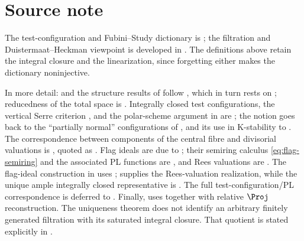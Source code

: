 \section*{Source note}

The test-configuration and Fubini--Study dictionary is
\cite[\S\S1--2]{BJ22}; the filtration and Duistermaat--Heckman viewpoint is
developed in \cite{BHJ17}.  The definitions above retain the integral
closure and the linearization, since forgetting either makes the dictionary
noninjective.

In more detail:  and the structure results
of  follow \cite[\S1.2]{BJ22}, which in turn
rests on \cite[\S2]{BHJ17}; reducedness of the total space is
\cite[Proposition~2.6]{BHJ17}.  Integrally closed test configurations, the
vertical Serre criterion , and
the polar-scheme argument in  are
\cite[\S1.4]{BJ22}; the notion goes back to the ``partially normal''
configurations of \cite{Od13}, and its use in K-stability to
\cite{Od13,Od13b}.  The correspondence between components of the central
fibre and divisorial valuations is \cite[Theorem~4.6]{BHJ17}, quoted as
\cite[Lemma~1.20]{BJ22}.  Flag ideals are due to \cite{Od13}; their
semiring calculus \eqref{eq:flag-semiring} and the associated PL functions
are \cite[\S2.1]{BJ22}, and Rees valuations are
\cite[Definition~2.10]{BJ22}.  The flag-ideal construction in
 uses
\cite[Lemmas~2.8--2.9 and Proposition~2.25]{BJ22};
\cite[Lemma~2.12]{BJ22} supplies the Rees-valuation realization, while the
unique ample integrally closed representative is
\cite[Proposition~2.30]{BJ22}.  The full test-configuration/PL
correspondence \cite[Theorem~2.31]{BJ22} is deferred to
.  Finally,
 uses
\cite[Lemma~1.8]{BJ22} together with relative $\Proj$ reconstruction.
The uniqueness theorem does not identify an arbitrary finitely generated
filtration with its saturated integral closure.  That quotient is stated explicitly in
.

